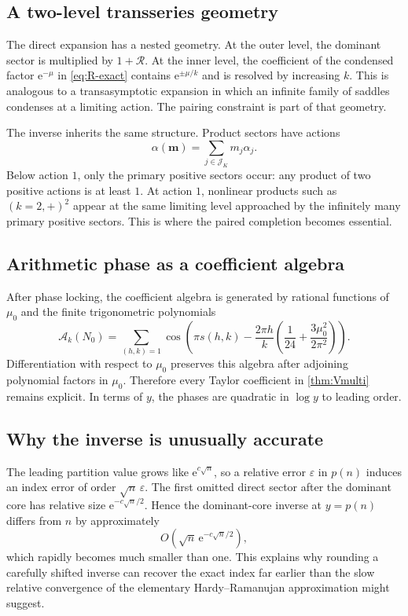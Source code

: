 \documentclass[11pt,a4paper]{article}
\numberwithin{equation}{section}
\theoremstyle{definition}
\theoremstyle{remark}
\newcommand{\e}{\mathrm e}
\newcommand{\Acal}{\mathcal A}
\newcommand{\Rcal}{\mathcal R}
\newcommand{\Jcal}{\mathcal J}
\newcommand{\multi}[1]{\boldsymbol{#1}}
\begin{document}
\subsection{A two-level transseries geometry}

The direct expansion has a nested geometry.  At the outer level, the dominant
sector is multiplied by $1+\Rcal$.  At the inner level, the coefficient of the
condensed factor $\e^{-\mu}$ in \eqref{eq:R-exact} contains
$\e^{\pm\mu/k}$ and is resolved by increasing $k$.  This is analogous to a
transasymptotic expansion in which an infinite family of saddles condenses at a
limiting action.  The pairing constraint is part of that geometry.

The inverse inherits the same structure.  Product sectors have actions
\begin{equation}\label{eq:multi-action}
 \alpha(\multi m)=\sum_{j\in\Jcal_K}m_j\alpha_j.
\end{equation}
Below action $1$, only the primary positive sectors occur: any product of two
positive actions is at least $1$.  At action $1$, nonlinear products such as
$(k=2,+)^2$ appear at the same limiting level approached by the infinitely many
primary positive sectors.  This is where the paired completion becomes
essential.

\subsection{Arithmetic phase as a coefficient algebra}

After phase locking, the coefficient algebra is generated by rational
functions of $\mu_0$ and the finite trigonometric polynomials
\begin{equation}\label{eq:chirp-generator}
 \Acal_k(N_0)=\sum_{(h,k)=1}
 \cos\!\left(\pi s(h,k)-\frac{2\pi h}{k}
 \left(\frac1{24}+\frac{3\mu_0^2}{2\pi^2}\right)\right).
\end{equation}
Differentiation with respect to $\mu_0$ preserves this algebra after adjoining
polynomial factors in $\mu_0$.  Therefore every Taylor coefficient in
\cref{thm:Vmulti} remains explicit.  In terms of $y$, the phases are quadratic
in $\log y$ to leading order.

\subsection{Why the inverse is unusually accurate}

The leading partition value grows like $\e^{c\sqrt n}$, so a relative error
$\varepsilon$ in $p(n)$ induces an index error of order $\sqrt n\,\varepsilon$.
The first omitted direct sector after the dominant core has relative size
$\e^{-c\sqrt n/2}$.  Hence the dominant-core inverse at $y=p(n)$ differs from
$n$ by approximately
\[
 O\!\left(\sqrt n\,\e^{-c\sqrt n/2}\right),
\]
which rapidly becomes much smaller than one.  This explains why rounding a
carefully shifted inverse can recover the exact index far earlier than the
slow relative convergence of the elementary Hardy--Ramanujan approximation
might suggest.
\end{document}
